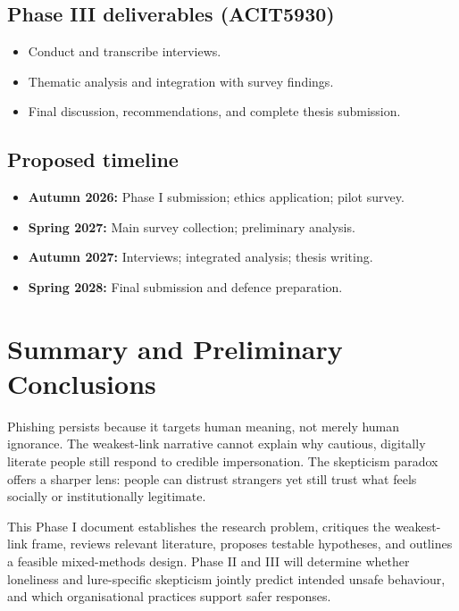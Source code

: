 \documentclass[UKenglish,12pt]{master-style}
\begin{document}
\section{Phase III deliverables (ACIT5930)}

\begin{itemize}
    \item Conduct and transcribe interviews.
    \item Thematic analysis and integration with survey findings.
    \item Final discussion, recommendations, and complete thesis submission.
\end{itemize}

\section{Proposed timeline}

\begin{itemize}
    \item \textbf{Autumn 2026:} Phase I submission; ethics application; pilot survey.
    \item \textbf{Spring 2027:} Main survey collection; preliminary analysis.
    \item \textbf{Autumn 2027:} Interviews; integrated analysis; thesis writing.
    \item \textbf{Spring 2028:} Final submission and defence preparation.
\end{itemize}

\chapter{Summary and Preliminary Conclusions}
\label{ch:conclusion}

Phishing persists because it targets human meaning, not merely human ignorance. The weakest-link narrative cannot explain why cautious, digitally literate people still respond to credible impersonation. The skepticism paradox offers a sharper lens: people can distrust strangers yet still trust what feels socially or institutionally legitimate.

This Phase I document establishes the research problem, critiques the weakest-link frame, reviews relevant literature, proposes testable hypotheses, and outlines a feasible mixed-methods design. Phase II and III will determine whether loneliness and lure-specific skepticism jointly predict intended unsafe behaviour, and which organisational practices support safer responses.
\end{document}
